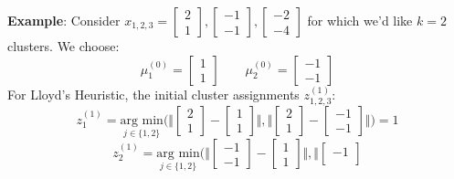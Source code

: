 {\footnotesize
    \textbf{Example}: Consider $x_{1,2,3} = \begin{bmatrix}
        2 \\
        1
    \end{bmatrix},
    \begin{bmatrix}
        -1 \\
        -1
    \end{bmatrix},
    \begin{bmatrix}
        -2 \\
        -4
    \end{bmatrix}$ for which we'd like $k=2$ clusters. We choose: 
    $$\mu_1^{(0)}= \begin{bmatrix}
        1 \\
        1
    \end{bmatrix} \qquad \mu_2^{(0)} = \begin{bmatrix}
        -1 \\
        -1
    \end{bmatrix}
    $$
    For Lloyd's Heuristic, the initial cluster assignments $z^{(1)}_{1,2,3}$:
    $$
        z_1^{(1)} = \underset{j\in\{1,2\}}{\text{arg min}} \Biggl( \Biggl\Vert \begin{bmatrix}
            2 \\
            1
        \end{bmatrix} - \begin{bmatrix}
            1 \\
            1
        \end{bmatrix} \Biggr\Vert, \Biggl\Vert \begin{bmatrix}
            2 \\
            1
        \end{bmatrix} - \begin{bmatrix}
            -1 \\
            -1
        \end{bmatrix} \Biggr\Vert  \Biggr) = 1
    $$
    $$
        z_2^{(1)} = \underset{j\in\{1,2\}}{\text{arg min}} \Biggl( \Biggl\Vert \begin{bmatrix}
            -1 \\
            -1
        \end{bmatrix} - \begin{bmatrix}
            1 \\
            1
        \end{bmatrix} \Biggr\Vert, \Biggl\Vert \begin{bmatrix}
            -1 \\

\end{bmatrix}$$}

